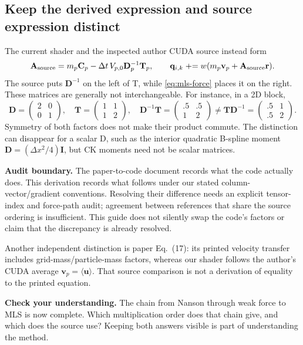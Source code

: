 \documentclass[11pt,a4paper]{article}
\newcommand{\mat}[1]{\mathbf{#1}}
\newcommand{\checkpoint}[1]{\par\textbf{Check your understanding.} #1\par}
\numberwithin{equation}{section}
\begin{document}
\subsection{Keep the derived expression and source expression distinct}
\label{sec:order-audit}
The current shader and the inspected author CUDA source instead form
\[
\mat A_{\rm source}=m_p\mat C_p
 -\Delta t\,V_{p,0}\mat D_p^{-1}\mat T_p,
\qquad
\mat q_{i,k}\mathrel{+}=w(m_p\mat v_p+\mat A_{\rm source}\mat r).
\]
The source puts $\mat D^{-1}$ on the left of T, while
\eqref{eq:mls-force} places it on the right. These matrices are generally
not interchangeable. For instance, in a 2D block,
\[
\mat D=\begin{pmatrix}2&0\\0&1\end{pmatrix},\quad
\mat T=\begin{pmatrix}1&1\\1&2\end{pmatrix},\quad
\mat D^{-1}\mat T=\begin{pmatrix}.5&.5\\1&2\end{pmatrix}
\ne
\mat T\mat D^{-1}=\begin{pmatrix}.5&1\\.5&2\end{pmatrix}.
\]
Symmetry of both factors does not make their product commute. The distinction
can disappear for a scalar D, such as the interior quadratic B-spline moment
$\mat D=(\Delta x^2/4)\mat I$, but CK moments need not be scalar matrices.

\textbf{Audit boundary.} The paper-to-code document records what the code
actually does. This derivation records what follows under our stated
column-vector/gradient conventions. Resolving their difference needs an
explicit tensor-index and force-path audit; agreement between references that
share the source ordering is insufficient. This guide does not silently swap
the code's factors or claim that the discrepancy is already resolved.

Another independent distinction is paper Eq.~(17): its printed velocity
transfer includes grid-mass/particle-mass factors, whereas our shader follows
the author's CUDA average $\mat v_p=\langle\mat u\rangle$.
That source comparison is not a derivation of equality to the printed equation.
\checkpoint{The chain from Nanson through weak force to MLS is now complete.
Which multiplication order does that chain give, and which does the source
use? Keeping both answers visible is part of understanding the method.}
\end{document}

